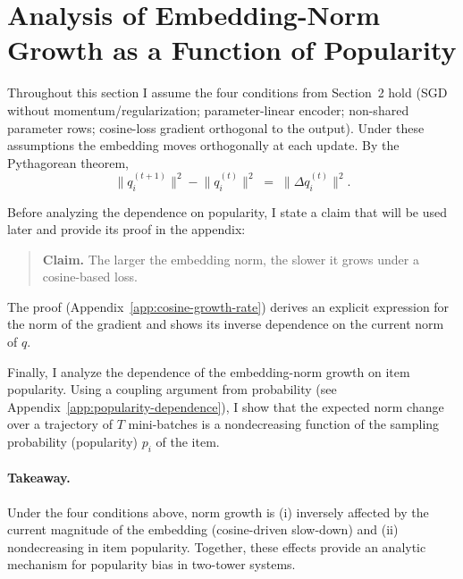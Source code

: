 \section{Analysis of Embedding-Norm Growth as a Function of Popularity}

Throughout this section I assume the four conditions from Section~2 hold (SGD without momentum/regularization; parameter-linear encoder; non-shared parameter rows; cosine-loss gradient orthogonal to the output). Under these assumptions the embedding moves orthogonally at each update. By the Pythagorean theorem,
\begin{equation}
\label{eq:pythagoras-increment}
\bigl\|q_i^{(t+1)}\bigr\|^{2} - \bigl\|q_i^{(t)}\bigr\|^{2} \;=\; \bigl\|\Delta q_i^{(t)}\bigr\|^{2}.
\end{equation}

Before analyzing the dependence on popularity, I state a claim that will be used later and provide its proof in the appendix:
\begin{quote}
\textbf{Claim.} The larger the embedding norm, the slower it grows under a cosine-based loss.
\end{quote}
The proof (Appendix~\ref{app:cosine-growth-rate}) derives an explicit expression for the norm of the gradient and shows its inverse dependence on the current norm of $q$.

Finally, I analyze the dependence of the embedding-norm growth on item popularity. Using a coupling argument from probability (see Appendix~\ref{app:popularity-dependence}), I show that the expected norm change over a trajectory of $T$ mini-batches is a nondecreasing function of the sampling probability (popularity) $p_i$ of the item.

\paragraph{Takeaway.} Under the four conditions above, norm growth is (i) inversely affected by the current magnitude of the embedding (cosine-driven slow-down) and (ii) nondecreasing in item popularity. Together, these effects provide an analytic mechanism for popularity bias in two-tower systems.


